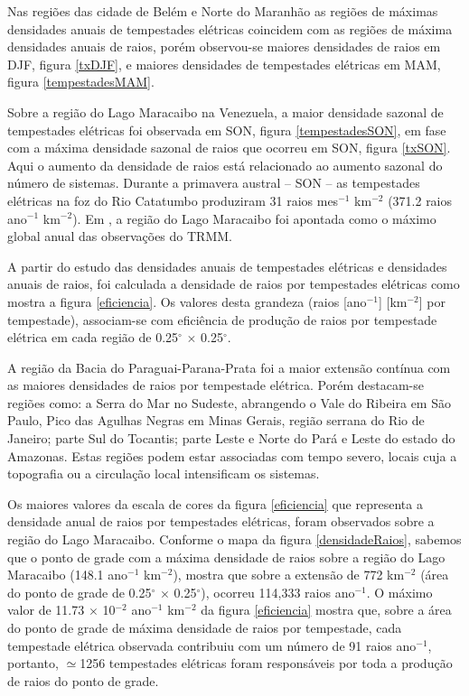 Nas regiões das cidade de Belém e Norte do Maranhão as regiões de máximas densidades anuais de tempestades elétricas coincidem com as regiões de máxima densidades anuais de raios, porém observou-se maiores densidades de raios em DJF, figura \ref{txDJF}, e maiores densidades de tempestades elétricas em MAM, figura \ref{tempestadesMAM}. 

Sobre a região do Lago Maracaibo na Venezuela, a maior densidade sazonal de tempestades elétricas foi observada em SON, figura \ref{tempestadesSON}, em fase com a máxima densidade sazonal de raios que ocorreu em SON, figura \ref{txSON}. Aqui o aumento da densidade de raios está relacionado ao aumento sazonal do número de sistemas. Durante a primavera austral -- SON --  as tempestades elétricas na foz do Rio Catatumbo produziram 31 raios mes$^{-1}$ km$^{-2}$ (371.2 raios ano$^{-1}$ km$^{-2}$). Em , a região do Lago Maracaibo foi apontada como o máximo global anual das observações do TRMM. 


A partir do estudo das densidades anuais de tempestades elétricas e densidades anuais de raios, foi calculada a densidade de raios por tempestades elétricas como mostra a figura \ref{eficiencia}. Os valores desta grandeza (raios [ano$^{-1}$] [km$^{-2}$] por tempestade), associam-se com eficiência de produção de raios por tempestade elétrica em cada região de 0.25$^{\circ}$ $\times$ 0.25$^{\circ}$.

A região da Bacia do Paraguai-Parana-Prata foi a maior extensão contínua com as maiores densidades de raios por tempestade elétrica. Porém destacam-se regiões como: a Serra do Mar no Sudeste, abrangendo o Vale do Ribeira em São Paulo, Pico das Agulhas Negras em Minas Gerais, região serrana do Rio de Janeiro; parte Sul do Tocantis; parte Leste e Norte do Pará e Leste do estado do Amazonas. Estas regiões podem estar associadas com tempo severo, locais cuja a topografia ou a circulação local intensificam os sistemas.

Os maiores valores da escala de cores da figura \ref{eficiencia} que representa a densidade anual de raios por tempestades elétricas, foram observados sobre a região do Lago Maracaibo. Conforme o mapa da figura \ref{densidadeRaios}, sabemos que o ponto de grade com a máxima densidade de raios sobre a região do Lago Maracaibo (148.1 ano$^{-1}$ km$^{-2}$), mostra que sobre a extensão de 772 km$^{-2}$ (área do ponto de grade de  0.25$^{\circ}$ $\times$ 0.25$^{\circ}$), ocorreu 114,333 raios ano$^{-1}$. O máximo valor de  11.73 $\times$ 10$^{-2}$ ano$^{-1}$ km$^{-2}$ da figura \ref{eficiencia} mostra que, sobre a área do ponto de grade de máxima densidade de raios por tempestade, cada tempestade elétrica observada contribuiu com um número de 91 raios ano$^{-1}$, portanto, $\simeq$1256 tempestades elétricas foram responsáveis por toda a produção de raios do ponto de grade.  

